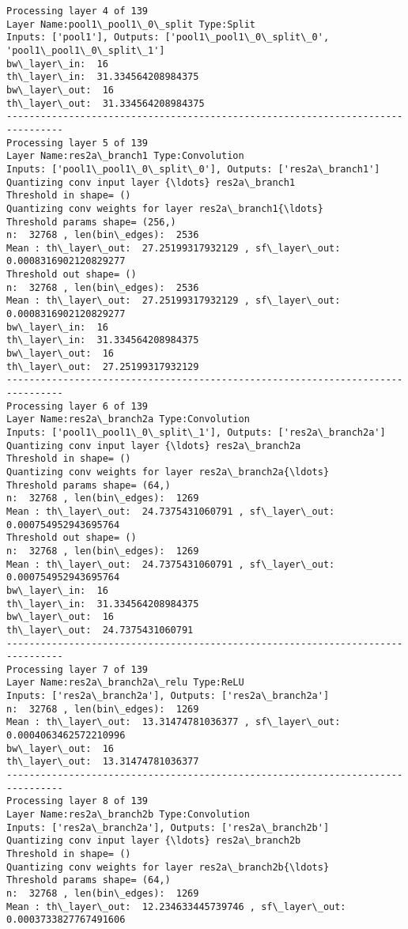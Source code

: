 \documentclass[11pt]{article}
\begin{document}
\begin{Verbatim}[commandchars=\\\{\}]
Processing layer 4 of 139
Layer Name:pool1\_pool1\_0\_split Type:Split
Inputs: ['pool1'], Outputs: ['pool1\_pool1\_0\_split\_0', 'pool1\_pool1\_0\_split\_1']
bw\_layer\_in:  16
th\_layer\_in:  31.334564208984375
bw\_layer\_out:  16
th\_layer\_out:  31.334564208984375
--------------------------------------------------------------------------------
Processing layer 5 of 139
Layer Name:res2a\_branch1 Type:Convolution
Inputs: ['pool1\_pool1\_0\_split\_0'], Outputs: ['res2a\_branch1']
Quantizing conv input layer {\ldots} res2a\_branch1
Threshold in shape= ()
Quantizing conv weights for layer res2a\_branch1{\ldots}
Threshold params shape= (256,)
n:  32768 , len(bin\_edges):  2536
Mean : th\_layer\_out:  27.25199317932129 , sf\_layer\_out:  0.0008316902120829277
Threshold out shape= ()
n:  32768 , len(bin\_edges):  2536
Mean : th\_layer\_out:  27.25199317932129 , sf\_layer\_out:  0.0008316902120829277
bw\_layer\_in:  16
th\_layer\_in:  31.334564208984375
bw\_layer\_out:  16
th\_layer\_out:  27.25199317932129
--------------------------------------------------------------------------------
Processing layer 6 of 139
Layer Name:res2a\_branch2a Type:Convolution
Inputs: ['pool1\_pool1\_0\_split\_1'], Outputs: ['res2a\_branch2a']
Quantizing conv input layer {\ldots} res2a\_branch2a
Threshold in shape= ()
Quantizing conv weights for layer res2a\_branch2a{\ldots}
Threshold params shape= (64,)
n:  32768 , len(bin\_edges):  1269
Mean : th\_layer\_out:  24.7375431060791 , sf\_layer\_out:  0.000754952943695764
Threshold out shape= ()
n:  32768 , len(bin\_edges):  1269
Mean : th\_layer\_out:  24.7375431060791 , sf\_layer\_out:  0.000754952943695764
bw\_layer\_in:  16
th\_layer\_in:  31.334564208984375
bw\_layer\_out:  16
th\_layer\_out:  24.7375431060791
--------------------------------------------------------------------------------
Processing layer 7 of 139
Layer Name:res2a\_branch2a\_relu Type:ReLU
Inputs: ['res2a\_branch2a'], Outputs: ['res2a\_branch2a']
n:  32768 , len(bin\_edges):  1269
Mean : th\_layer\_out:  13.31474781036377 , sf\_layer\_out:  0.0004063462572210996
bw\_layer\_out:  16
th\_layer\_out:  13.31474781036377
--------------------------------------------------------------------------------
Processing layer 8 of 139
Layer Name:res2a\_branch2b Type:Convolution
Inputs: ['res2a\_branch2a'], Outputs: ['res2a\_branch2b']
Quantizing conv input layer {\ldots} res2a\_branch2b
Threshold in shape= ()
Quantizing conv weights for layer res2a\_branch2b{\ldots}
Threshold params shape= (64,)
n:  32768 , len(bin\_edges):  1269
Mean : th\_layer\_out:  12.234633445739746 , sf\_layer\_out:  0.0003733827767491606

\end{Verbatim}
\end{document}

